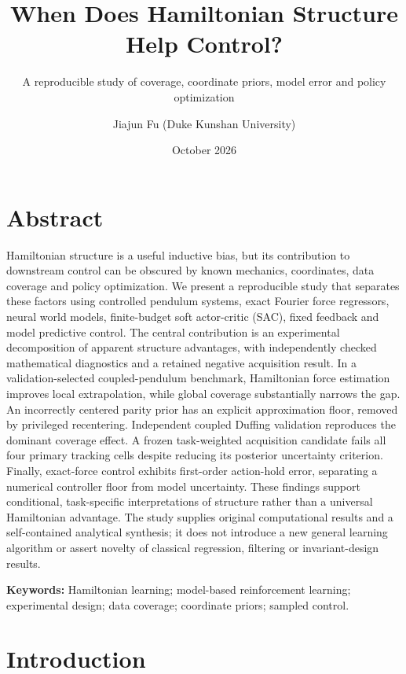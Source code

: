 \documentclass[
  10pt,
]{article}
\title{When Does Hamiltonian Structure Help Control?}
\subtitle{A reproducible study of coverage, coordinate priors, model
error and policy optimization}
\author{Jiajun Fu (Duke Kunshan University)}
\date{October 2026}
\begin{document}
\maketitle

\hypertarget{abstract}{%
\section*{Abstract}\label{abstract}}

Hamiltonian structure is a useful inductive bias, but its contribution
to downstream control can be obscured by known mechanics, coordinates,
data coverage and policy optimization. We present a reproducible study
that separates these factors using controlled pendulum systems, exact
Fourier force regressors, neural world models, finite-budget soft
actor-critic (SAC), fixed feedback and model predictive control. The
central contribution is an experimental decomposition of apparent
structure advantages, with independently checked mathematical
diagnostics and a retained negative acquisition result. In a
validation-selected coupled-pendulum benchmark, Hamiltonian force
estimation improves local extrapolation, while global coverage
substantially narrows the gap. An incorrectly centered parity prior has
an explicit approximation floor, removed by privileged recentering.
Independent coupled Duffing validation reproduces the dominant coverage
effect. A frozen task-weighted acquisition candidate fails all four
primary tracking cells despite reducing its posterior uncertainty
criterion. Finally, exact-force control exhibits first-order action-hold
error, separating a numerical controller floor from model uncertainty.
These findings support conditional, task-specific interpretations of
structure rather than a universal Hamiltonian advantage. The study
supplies original computational results and a self-contained analytical
synthesis; it does not introduce a new general learning algorithm or
assert novelty of classical regression, filtering or invariant-design
results.

\textbf{Keywords:} Hamiltonian learning; model-based reinforcement
learning; experimental design; data coverage; coordinate priors; sampled
control.

\hypertarget{introduction}{%
\section{Introduction}\label{introduction}}
\end{document}
